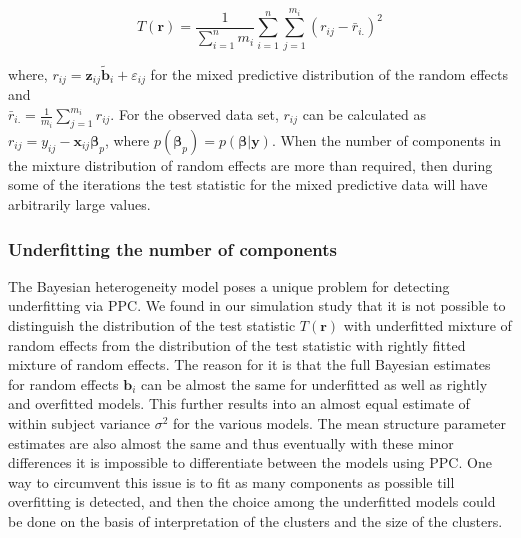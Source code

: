 \begin{equation}
\label{eq : ppc_test_statistic}
T(\boldsymbol{r}) = \frac 1 {\sum_{i=1}^n m_i} \sum_{i=1}^n \sum_{j=1}^{m_i} {(r_{ij}-\bar{r}_{i.})}^2
\end{equation}

where, $r_{ij} = \boldsymbol{z}_{ij}\boldsymbol{\tilde{b}}_i + \varepsilon_{ij}$ for the mixed predictive distribution of the random effects and\\ $\bar{r}_{i.} = \frac 1 {m_i} \sum_{j=1}^{m_i} r_{ij}$. For the observed data set, $r_{ij}$ can be calculated as $r_{ij} = y_{ij} - \boldsymbol{x}_{ij}\boldsymbol{\beta}_p$, where $p(\boldsymbol{\beta}_p) = p(\boldsymbol{\beta}|\boldsymbol{y})$. When the number of components in the mixture distribution of random effects are more than required, then during some of the iterations the test statistic for the mixed predictive data will have arbitrarily large values.

\subsubsection{Underfitting the number of components}
The Bayesian heterogeneity model poses a unique problem for detecting underfitting via PPC. We found in our simulation study that it is not possible to distinguish the distribution of the test statistic $T(\boldsymbol{r})$ with underfitted mixture of random effects from the distribution of the test statistic with rightly fitted mixture of random effects. The reason for it is that the full Bayesian estimates for random effects $\boldsymbol{b}_i$ can be almost the same for underfitted as well as rightly and overfitted models. This further results into an almost equal estimate of within subject variance $\sigma^2$ for the various models. The mean structure parameter estimates are also almost the same and thus eventually with these minor differences it is impossible to differentiate between the models using PPC. One way to circumvent this issue is to fit as many components as possible till overfitting is detected, and then the choice among the underfitted models could be done on the basis of interpretation of the clusters and the size of the clusters.
 
